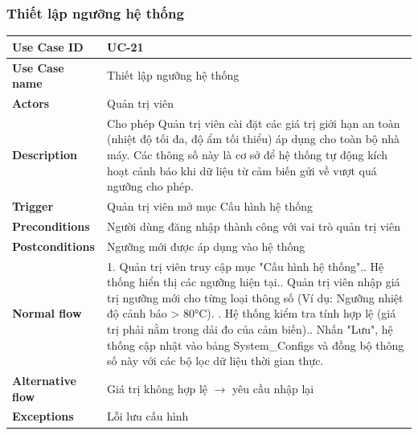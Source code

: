 \subsubsection{Thiết lập ngưỡng hệ thống}
\begin{tabular}{|p{3.5cm}|p{9.5cm}|}
\hline
\textbf{Use Case ID} & UC-21 \\
\hline
\textbf{Use Case name} & Thiết lập ngưỡng hệ thống \\
\hline
\textbf{Actors} & Quản trị viên \\
\hline
\textbf{Description} & 
Cho phép Quản trị viên cài đặt các giá trị giới hạn an toàn (nhiệt độ tối đa, độ ẩm tối thiểu) áp dụng cho toàn bộ nhà máy. Các thông số này là cơ sở để hệ thống tự động kích hoạt cảnh báo khi dữ liệu từ cảm biến gửi về vượt quá ngưỡng cho phép. \\
\hline
\textbf{Trigger} & Quản trị viên mở mục Cấu hình hệ thống \\
\hline
\textbf{Preconditions} & Người dùng đăng nhập thành công với vai trò quản trị viên \\
\hline
\textbf{Postconditions} & Ngưỡng mới được áp dụng vào hệ thống \\
\hline
\textbf{Normal flow} & 
1. Quản trị viên truy cập mục "Cấu hình hệ thống".\newline 2. Hệ thống hiển thị các ngưỡng hiện tại.\newline 3. Quản trị viên nhập giá trị ngưỡng mới cho từng loại thông số (Ví dụ: Ngưỡng nhiệt độ cảnh báo > 80°C). \newline 4. Hệ thống kiểm tra tính hợp lệ (giá trị phải nằm trong dải đo của cảm biến).\newline 5. Nhấn "Lưu", hệ thống cập nhật vào bảng System\_Configs và đồng bộ thông số này với các bộ lọc dữ liệu thời gian thực. \\
\hline
\textbf{Alternative flow} & 
Giá trị không hợp lệ $\rightarrow$ yêu cầu nhập lại \\
\hline
\textbf{Exceptions} & Lỗi lưu cấu hình \\
\hline
\end{tabular}

